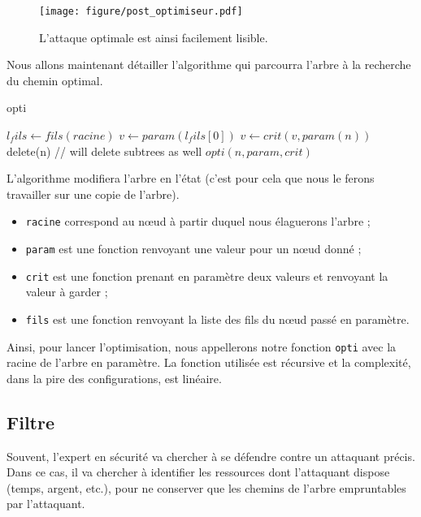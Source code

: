 		\begin{figure}[h!]
			\centering
				\texttt{[image: figure/post\_optimiseur.pdf]}
			\caption{L'attaque optimale est ainsi facilement lisible.}
			\label{fig:arbre_post_opti}
		\end{figure}
	
		Nous allons maintenant détailler l'algorithme qui parcourra l'arbre à la recherche du chemin optimal.
		\begin{algorithm}[h!]
		\caption{opti}
		\begin{algorithmic}
			\STATE $l_fils \leftarrow fils(racine)$
				\RETURN
			\ENDIF
				\STATE $v \leftarrow param(l_fils[0])$
					\STATE $v \leftarrow crit(v, param(n))$
				\ENDFOR
						\STATE delete(n) // will delete subtrees as well
					\ENDIF
				\ENDFOR
			\ENDIF
				\STATE $opti(n, param, crit)$
			\ENDFOR

		\end{algorithmic}
		\end{algorithm}

		L'algorithme modifiera l'arbre en l'état (c'est pour cela que nous le ferons travailler sur une copie de l'arbre).
		\begin{itemize}
			\item \verb|racine| correspond au nœud à partir duquel nous élaguerons l'arbre ;
			\item \verb|param| est une fonction renvoyant une valeur pour un nœud donné ;
			\item \verb|crit| est une fonction prenant en paramètre deux valeurs et renvoyant la valeur à \og garder \fg{} ;
			\item \verb|fils| est une fonction renvoyant la liste des fils du nœud passé en paramètre.
		\end{itemize}

		Ainsi, pour lancer l'optimisation, nous appellerons notre fonction \verb|opti| avec la racine de l'arbre en paramètre. La fonction utilisée est récursive et la complexité, dans la pire des configurations, est linéaire.

	\subsection{Filtre}
	\label{subsection:filtre} 
		Souvent, l'expert en sécurité va chercher à se défendre contre un attaquant précis. Dans ce cas, il va chercher à identifier les ressources dont l'attaquant dispose (temps, argent, etc.), pour ne conserver que les chemins de l'arbre empruntables par l'attaquant.


